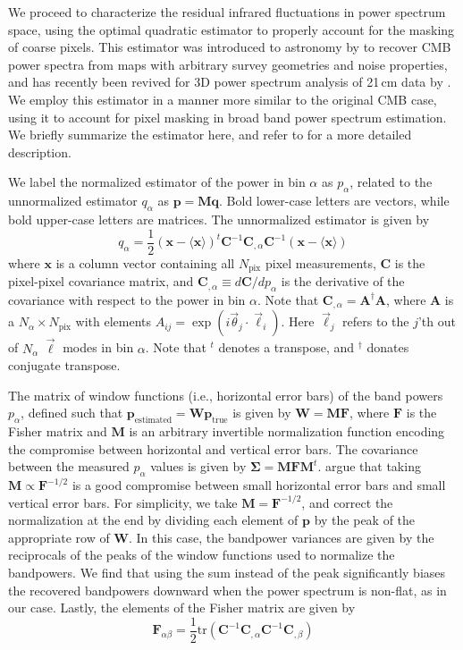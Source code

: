 \documentclass{emulateapj}
\newcommand{\Fb}{\mathbf{F}}
\newcommand{\Mb}{\mathbf{M}}
\newcommand{\Cb}{\mathbf{C}}
\newcommand{\Ab}{\mathbf{A}}
\newcommand{\xb}{\mathbf{x}}
\newcommand{\pb}{\mathbf{p}}
\newcommand{\Wb}{\mathbf{W}}
\begin{document}
We proceed to characterize the residual infrared fluctuations in power spectrum space, using the optimal quadratic estimator to properly account for the masking of coarse pixels. This estimator was introduced to astronomy by \citet{Maxpowerspeclossless} to recover CMB power spectra from maps with arbitrary survey geometries and noise properties, and has recently been revived for 3D power spectrum analysis of 21\,cm data by \citet{X13, dillonneben, LT11, DillonFast, ali15}. We employ this estimator in a manner more similar to the original CMB case, using it to account for pixel masking in broad band power spectrum estimation. We briefly summarize the estimator here, and refer to \citet{X13} for a more detailed description.

We label the normalized estimator of the power in bin $\alpha$ as $p_\alpha$, related to the unnormalized estimator $q_\alpha$ as $\mathbf{p} = \Mb \mathbf{q}$. Bold lower-case letters are vectors, while bold upper-case letters are matrices. The unnormalized estimator is given by
\begin{equation}
q_\alpha = \frac{1}{2}(\xb-\langle\xb\rangle)^t \Cb^{-1} \Cb_{,\alpha}\Cb^{-1}(\xb-\langle\xb\rangle)
\end{equation}
where $\xb$ is a column vector containing all $N_\text{pix}$ pixel measurements, $\Cb$ is the pixel-pixel covariance matrix, and $\Cb_{,\alpha}\equiv d\Cb/dp_\alpha$ is the derivative of the covariance with respect to the power in bin $\alpha$. Note that $\Cb_{,\alpha} = \Ab^\dagger\Ab$, where $\Ab$ is a $N_\alpha\times N_\text{pix}$ with elements $A_{ij}=\exp(i\vec{\theta}_j\cdot\vec{\ell}_i)$. Here $\vec{\ell}_j$ refers to the $j$'th out of $N_\alpha$ $\vec{\ell}$ modes in bin $\alpha$. Note that $^t$ denotes a transpose, and $^\dagger$ donates conjugate transpose.

The matrix of window functions (i.e., horizontal error bars) of the band powers $p_\alpha$, defined such that $\pb_\text{estimated}=\Wb\pb_\text{true}$ is given by $\Wb=\Mb\Fb$, where $\Fb$ is the Fisher matrix and $\Mb$ is an arbitrary invertible normalization function encoding the compromise between horizontal and vertical error bars. The covariance between the measured $p_\alpha$ values is given by $\mathbf{\Sigma} = \Mb\Fb\Mb^t$. \citet{X13} argue that taking $\Mb\propto \Fb^{-1/2}$ is a good compromise between small horizontal error bars and small vertical error bars. For simplicity, we take $\Mb=\Fb^{-1/2}$, and correct the normalization at the end by dividing each element of $\pb$ by the peak of the appropriate row of $\Wb$. In this case, the bandpower variances are given by the reciprocals of the peaks of the window functions used to normalize the bandpowers. We find that using the sum instead of the peak significantly biases the recovered bandpowers downward when the power spectrum is non-flat, as in our case. Lastly, the elements of the Fisher matrix are given by
\begin{equation}
\Fb_{\alpha\beta}=\frac{1}{2}\text{tr}\left(\Cb^{-1} \Cb_{,\alpha} \Cb^{-1} \Cb_{,\beta} \right)	
\end{equation}
\end{document}
